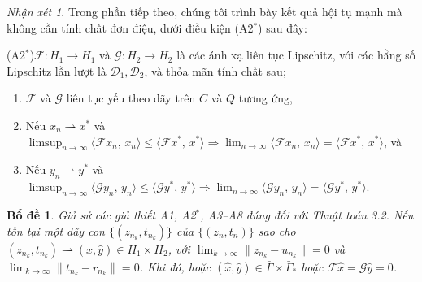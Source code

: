 \documentclass{MyBook}
\theoremstyle{plain}
\newtheorem{lemma}[theorem]{Bổ đề}
\theoremstyle{definition}
\theoremstyle{remark}
\newtheorem{remark}[theorem]{Nhận xét}
\numberwithin{equation}{chapter}
\newcommand{\Fc}{\mathcal{F}}
\newcommand{\Gc}{\mathcal{G}}
\newcommand{\Dc}{\mathcal{D}}
\newcommand{\inp}[2]{\langle #1,\,#2\rangle}
\newcommand{\nm}[1]{\lVert #1\rVert}
\newcommand{\wto}{\rightharpoonup}
\newcommand{\Gam}{\bar{\Gamma}}
\newcommand{\Gams}{\bar{\Gamma}_{*}}
\begin{document}
\begin{remark}\label{rem:4.10}
Trong phần tiếp theo, chúng tôi trình bày kết quả hội tụ mạnh mà không cần tính chất đơn điệu, dưới điều kiện (A2$^{*}$) sau đây:
\end{remark}

\noindent(A2$^{*}$)\quad $\Fc:H_1\to H_1$ và $\Gc:H_2\to H_2$ là các ánh xạ liên tục Lipschitz, với các hằng số Lipschitz lần lượt là $\Dc_1,\Dc_2$, và thỏa mãn tính chất sau;
\begin{enumerate}[label=(\roman*)]
\item $\Fc$ và $\Gc$ liên tục yếu theo dãy trên $C$ và $Q$ tương ứng,
\item Nếu $x_n\wto x^{*}$ và $\limsup_{n\to\infty}\inp{\Fc x_n}{x_n}\le\inp{\Fc x^{*}}{x^{*}}\Longrightarrow\lim_{n\to\infty}\inp{\Fc x_n}{x_n}=\inp{\Fc x^{*}}{x^{*}}$, và
\item[(ii)] Nếu $y_n\wto y^{*}$ và $\limsup_{n\to\infty}\inp{\Gc y_n}{y_n}\le\inp{\Gc y^{*}}{y^{*}}\Longrightarrow\lim_{n\to\infty}\inp{\Gc y_n}{y_n}=\inp{\Gc y^{*}}{y^{*}}$.
\end{enumerate}

\begin{lemma}\label{lem:4.11}
Giả sử các giả thiết A1, A2$^{*}$, A3--A8 đúng đối với Thuật toán 3.2. Nếu tồn tại một dãy con $\{(z_{n_k},t_{n_k})\}$ của $\{(z_n,t_n)\}$ sao cho $(z_{n_k},t_{n_k})\wto(\hat{x},\hat{y})\in H_1\times H_2$, với $\lim_{k\to\infty}\nm{z_{n_k}-u_{n_k}}=0$ và $\lim_{k\to\infty}\nm{t_{n_k}-r_{n_k}}=0$. Khi đó, hoặc $(\hat{x},\hat{y})\in\Gam\times\Gams$ hoặc $\Fc\hat{x}=\Gc\hat{y}=0$.
\end{lemma}
\end{document}
